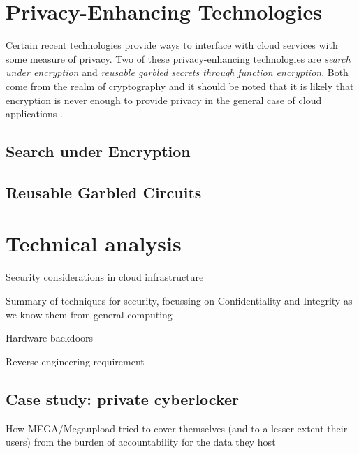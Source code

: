 \documentclass[11pt]{article}
\begin{document}
\section{Privacy-Enhancing Technologies}
\label{sec:pet}

Certain recent technologies provide ways to interface with cloud services with some measure of privacy.
Two of these privacy-enhancing technologies are \emph{search under encryption} and \emph{reusable garbled secrets through function encryption}.
Both come from the realm of cryptography and it should be noted that it is likely that encryption is never enough to provide privacy in the general case of cloud applications \cite{van2010impossibility}.

\subsection{Search under Encryption}

\subsection{Reusable Garbled Circuits}



\section{Technical analysis}
\label{sec:technical_analysis}
Security considerations in cloud infrastructure

Summary of techniques for security, focussing on Confidentiality and Integrity as we know them from general computing


Hardware backdoors \cite{sparks2009chipset, duflot2010limits}

Reverse engineering requirement
\cite{rutkowska2008bluepilling}

\subsection{Case study: private cyberlocker}
\label{sec:cyberlocker}
How MEGA/Megaupload tried to cover themselves (and to a lesser extent their users) from the burden of accountability for the data they host
\end{document}
